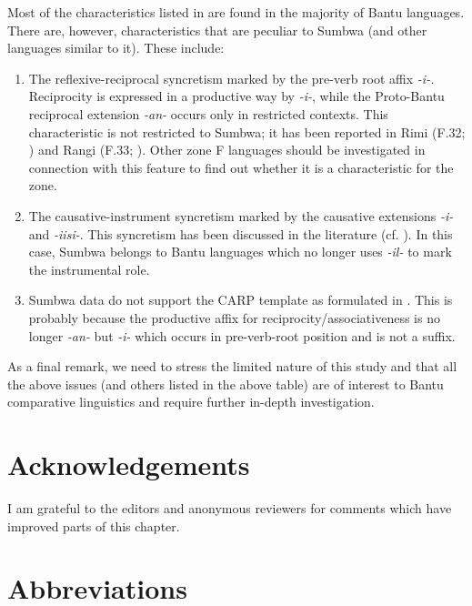 \documentclass[output=paper		  ]{langscibook}
\begin{document}
{Most of the characteristics listed in  are found in the majority of Bantu languages. There are, however, characteristics that are peculiar to Sumbwa (and other languages similar to it). These include:}

\begin{enumerate}
\item {The reflexive-reciprocal syncretism marked by the pre-verb root affix} {\textit{{}-i-.}} {Reciprocity is expressed in a productive way by} {\textit{{}-i-}}{, while the Proto-Bantu reciprocal extension} {\textit{{}-an-}} {occurs only in restricted contexts. This characteristic is not restricted to Sumbwa; it has been reported in Rimi (F.32; \citealt{Olson1964}) and Rangi (F.33; \citealt{Stegen2002}). Other zone F languages should be investigated in connection with this feature to find out whether it is a characteristic for the zone.}

\item  {The causative-instrument syncretism marked by the causative extensions} {\textit{{}-i-}} {and} {\textit{{}-iisi-}}{. This syncretism has been discussed in the literature (cf. \citealt{Wald1998}). In this case, Sumbwa belongs to Bantu languages which no longer uses} {\textit{{}-il-}} {to mark the instrumental role.}

\item  {Sumbwa data do not support the CARP template as formulated in \citet{Hyman2002}. This is probably because the productive affix for reciprocity\slash associativeness is no longer} {\textit{{}-an-}} {but} {\textit{{}-i-}} {which occurs in pre-verb-root position and is not a suffix.}
\end{enumerate}


{As a final remark, we need to stress the limited nature of this study and that all the above issues (and others listed in the above table) are of interest to Bantu comparative linguistics and require further in-depth investigation.}

\section*{Acknowledgements}

I am grateful to the editors and anonymous reviewers for comments which have improved parts of this chapter.

\section*{Abbreviations}
\end{document}
